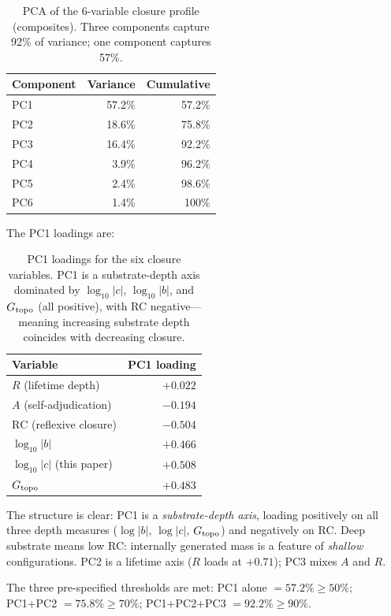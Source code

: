 \documentclass[12pt,a4paper]{article}
\newcommand{\RC}{\ensuremath{\mathrm{RC}}}
\begin{document}
\begin{table}[H]
\centering
\caption{PCA of the 6-variable closure profile (composites).
  Three components capture 92\% of variance;
  one component captures 57\%.}
\label{tab:pca}
\begin{tabular}{lrr}
\toprule
Component & Variance & Cumulative \\
\midrule
PC1 & 57.2\% & 57.2\% \\
PC2 & 18.6\% & 75.8\% \\
PC3 & 16.4\% & 92.2\% \\
PC4 &  3.9\% & 96.2\% \\
PC5 &  2.4\% & 98.6\% \\
PC6 &  1.4\% & 100\% \\
\bottomrule
\end{tabular}
\end{table}

The PC1 loadings are:

\begin{table}[H]
\centering
\caption{PC1 loadings for the six closure variables.
  PC1 is a substrate-depth axis dominated by
  $\log_{10}|c|$, $\log_{10}|b|$, and $G_{\rm topo}$ (all positive),
  with RC negative---meaning increasing substrate depth coincides with
  decreasing closure.}
\label{tab:pca_loadings}
\begin{tabular}{lr}
\toprule
Variable & PC1 loading \\
\midrule
$R$ (lifetime depth)        & $+0.022$ \\
$A$ (self-adjudication)     & $-0.194$ \\
$\RC$ (reflexive closure)   & $-0.504$ \\
$\log_{10}|b|$              & $+0.466$ \\
$\log_{10}|c|$ (this paper) & $+0.508$ \\
$G_{\rm topo}$              & $+0.483$ \\
\bottomrule
\end{tabular}
\end{table}

The structure is clear: PC1 is a \emph{substrate-depth axis}, loading
positively on all three depth measures ($\log|b|$, $\log|c|$, $G_{\rm topo}$)
and negatively on RC.
Deep substrate means low RC: internally generated mass is a feature of
\emph{shallow} configurations.
PC2 is a lifetime axis ($R$ loads at $+0.71$); PC3 mixes $A$ and $R$.

The three pre-specified thresholds are met:
PC1 alone $= 57.2\% \geq 50\%$; PC1+PC2 $= 75.8\% \geq 70\%$;
PC1+PC2+PC3 $= 92.2\% \geq 90\%$.
\end{document}
